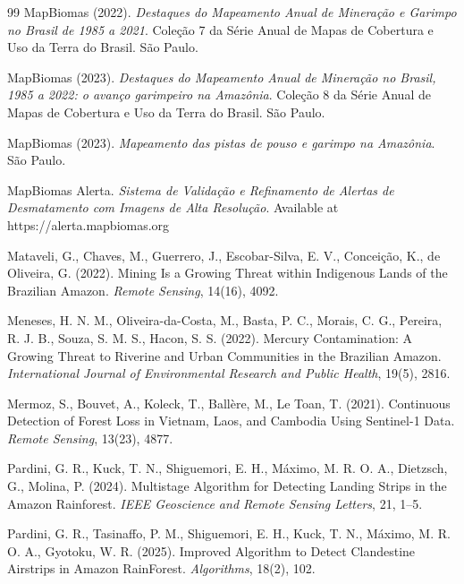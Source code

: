 \documentclass[11pt]{article}
\begin{document}
\begin{thebibliography}{99}
MapBiomas (2022).
\textit{Destaques do Mapeamento Anual de Minera\c{c}\~ao e Garimpo no Brasil de 1985 a 2021}.
Cole\c{c}\~ao 7 da S\'erie Anual de Mapas de Cobertura e Uso da Terra do Brasil. S\~ao Paulo.

MapBiomas (2023).
\textit{Destaques do Mapeamento Anual de Minera\c{c}\~ao no Brasil, 1985 a 2022: o avan\c{c}o garimpeiro na Amaz\^onia}.
Cole\c{c}\~ao 8 da S\'erie Anual de Mapas de Cobertura e Uso da Terra do Brasil. S\~ao Paulo.

MapBiomas (2023).
\textit{Mapeamento das pistas de pouso e garimpo na Amaz\^onia}. S\~ao Paulo.

MapBiomas Alerta.
\textit{Sistema de Valida\c{c}\~ao e Refinamento de Alertas de Desmatamento com Imagens de Alta Resolu\c{c}\~ao}.
Available at https://alerta.mapbiomas.org

Mataveli, G., Chaves, M., Guerrero, J., Escobar-Silva, E. V., Concei\c{c}\~ao, K., de Oliveira, G. (2022).
Mining Is a Growing Threat within Indigenous Lands of the Brazilian Amazon.
\textit{Remote Sensing}, 14(16), 4092.

Meneses, H. N. M., Oliveira-da-Costa, M., Basta, P. C., Morais, C. G., Pereira, R. J. B., Souza, S. M. S., Hacon, S. S. (2022).
Mercury Contamination: A Growing Threat to Riverine and Urban Communities in the Brazilian Amazon.
\textit{International Journal of Environmental Research and Public Health}, 19(5), 2816.

Mermoz, S., Bouvet, A., Koleck, T., Ball\`ere, M., Le Toan, T. (2021).
Continuous Detection of Forest Loss in Vietnam, Laos, and Cambodia Using Sentinel-1 Data.
\textit{Remote Sensing}, 13(23), 4877.

Pardini, G. R., Kuck, T. N., Shiguemori, E. H., M\'aximo, M. R. O. A., Dietzsch, G., Molina, P. (2024).
Multistage Algorithm for Detecting Landing Strips in the Amazon Rainforest.
\textit{IEEE Geoscience and Remote Sensing Letters}, 21, 1--5.

Pardini, G. R., Tasinaffo, P. M., Shiguemori, E. H., Kuck, T. N., M\'aximo, M. R. O. A., Gyotoku, W. R. (2025).
Improved Algorithm to Detect Clandestine Airstrips in Amazon RainForest.
\textit{Algorithms}, 18(2), 102.


\end{thebibliography}
\end{document}
